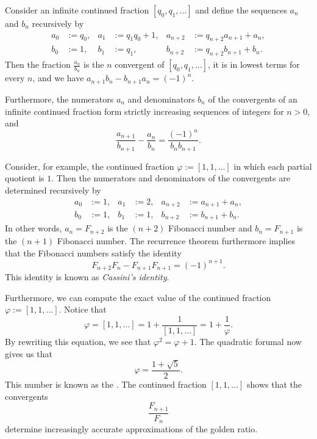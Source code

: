\begin{corollary}
  Consider an infinite continued fraction $[q_0,q_1,\ldots]$ and define the sequences $a_n$ and $b_n$ recursively by
  \begin{align*}
    a_0 & := q_0, & a_1 & := q_1q_0+1, & a_{n+2} & := q_{n+2}a_{n+1}+a_n, \\
    b_0 & := 1, & b_1 & := q_1, & b_{n+2} & := q_{n+2}b_{n+1}+b_n.
  \end{align*}
  Then the fraction $\frac{a_n}{b_n}$ is the $n$\supth{} convergent of $[q_0,q_1,\ldots]$, it is in lowest terms for every $n$, and we have $a_{n+1}b_n-b_{n+1}a_n=(-1)^{n}$.

  Furthermore, the numerators $a_n$ and denominators $b_n$ of the convergents of an infinite continued fraction form strictly increasing sequences of integers for $n>0$, and
  \begin{equation*}
    \frac{a_{n+1}}{b_{n+1}}-\frac{a_n}{b_n}=\frac{(-1)^n}{b_nb_{n+1}}.
  \end{equation*}
\end{corollary}

\begin{example}
  Consider, for example, the continued fraction $\varphi:=[1,1,\ldots]$ in which each partial quotient is $1$. Then the numerators and denominators of the convergents are determined recursively by
  \begin{align*}
    a_0 & := 1, & a_1 & := 2, & a_{n+2} & := a_{n+1}+a_n, \\
    b_0 & := 1, & b_1 & := 1, & b_{n+2} & := b_{n+1}+b_n.
  \end{align*}
  In other words, $a_n=F_{n+2}$ is the $(n+2)$\supnd{} Fibonacci number and $b_n=F_{n+1}$ is the $(n+1)$\supst{} Fibonacci number. The recurrence theorem furthermore implies that the Fibonacci numbers satisfy the identity
  \begin{equation*}
    F_{n+2}F_{n}-F_{n+1}F_{n+1}=(-1)^{n+1}.
  \end{equation*}
  This identity is known as \emph{Cassini's identity}.

  Furthermore, we can compute the exact value of the continued fraction $\varphi:=[1,1,\ldots]$. Notice that
  \begin{equation*}
    \varphi=[1,1,\ldots]=1+\frac{1}{[1,1,\ldots]}=1+\frac{1}{\varphi}.
  \end{equation*}
  By rewriting this equation, we see that $\varphi^2=\varphi +1$. The quadratic forumal now gives us that
  \begin{equation*}
    \varphi = \frac{1+\sqrt{5}}{2}. 
  \end{equation*}
  This number is known as the . The continued fraction $[1,1,\ldots]$ shows that the convergents
  \begin{equation*}
    \frac{F_{n+1}}{F_n}
  \end{equation*}
  determine increasingly accurate approximations of the golden ratio.
\end{example}

